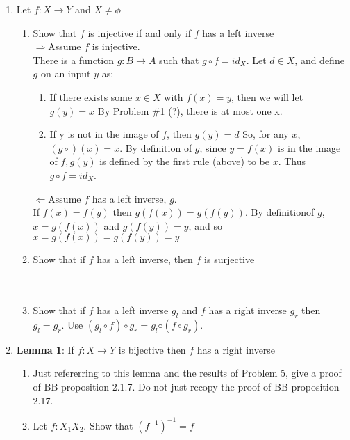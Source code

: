 \documentclass[11pt]{article}
\begin{document}
\begin{enumerate}
\item Let $f:X \to Y$ and $X \neq \phi$
\begin{enumerate}
\item Show that $f$ is injective if and only if $f$ has a left inverse\\
$\Rightarrow$Assume $f$ is injective.\\
There is a function $g:B \to A$ such that $g \circ f = id_X$.  Let $d \in X$, and define $g$ on an input $y$ as:
\begin{enumerate}
\item If there exists some $x \in X$ with $f(x) = y$, then we will let $g(y) = x$  By Problem \#1 (?), there is at most one x.
\item If y is not in the image of $f$, then $g(y) = d$
So, for any $x$, $(g \circ)(x) = x$.  By definition of $g$, since $y = f(x)$ is in the image of $f, g(y)$ is defined by the first rule (above) to be $x$.  Thus $g \circ f = id_X$. 
\end{enumerate} %
$\Leftarrow$Assume $f$ has a left inverse, $g$.\\
If $f(x) = f(y)$ then $g(f(x)) = g(f(y))$. By definitionof $g$, $x = g(f(x))$ and $g(f(y)) = y$, and so $x = g(f(x)) = g(f(y)) = y$\\
\item Show that if $f$ has a left inverse, then $f$ is surjective\\\\
\\
\item Show that if $f$ has a left inverse $g_l$ and $f$ has a right inverse
$g_r$ then $g_l = g_r$. Use $(g_l \circ f) \circ g_r = g_l ◦ (f \circ g_r )$.
\end{enumerate} %

\newpage
\item \textbf{Lemma 1}: If $f:X \to Y$ is bijective then $f$ has a right inverse
\begin{enumerate}
\item Just refererring to this lemma and the results of Problem 5, give a proof of BB proposition 2.1.7. Do not just recopy the proof of BB proposition 2.17.\\
\item Let $f: X_1 X_2$.  Show that $(f^{-1})^{-1} = f$
\end{enumerate}


\end{enumerate}
\end{document}
